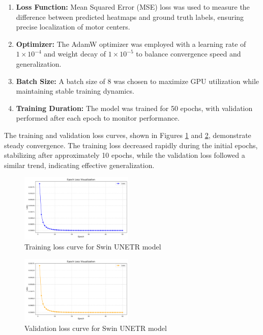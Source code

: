 \documentclass{article}
\begin{document}
\begin{enumerate}
    \item \textbf{Loss Function:} Mean Squared Error (MSE) loss was used to measure the difference between predicted heatmaps and ground truth labels, ensuring precise localization of motor centers.
    \item \textbf{Optimizer:} The AdamW optimizer was employed with a learning rate of $1 \times 10^{-4}$ and weight decay of $1 \times 10^{-5}$ to balance convergence speed and generalization.
    \item \textbf{Batch Size:} A batch size of 8 was chosen to maximize GPU utilization while maintaining stable training dynamics.
    \item \textbf{Training Duration:} The model was trained for 50 epochs, with validation performed after each epoch to monitor performance.
\end{enumerate}

The training and validation loss curves, shown in Figures \ref{fig:training_loss} and \ref{fig:validation_loss}, demonstrate steady convergence. The training loss decreased rapidly during the initial epochs, stabilizing after approximately 10 epochs, while the validation loss followed a similar trend, indicating effective generalization.

\begin{figure}[htb]
    \centering
    \includegraphics[width=0.48\textwidth]{images/unet_train_epoch_loss_visualization.png}
    \caption{Training loss curve for Swin UNETR model}
    \label{fig:training_loss}
\end{figure}

\begin{figure}[htb]
    \centering
    \includegraphics[width=0.48\textwidth]{images/unet_val_epoch_loss_visualization.png}
    \caption{Validation loss curve for Swin UNETR model}
    \label{fig:validation_loss}
\end{figure}
\end{document}

